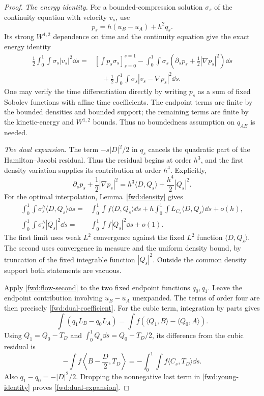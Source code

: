 \begin{proof}
\emph{The energy identity.}
For a bounded-compression solution \(\sigma_s\) of the continuity
equation with velocity \(v_s\), use
\[
 p_s=h(u_B-u_A)+h^2q_s.
\]
Its strong \(W^{1,2}\) dependence on time and the continuity
equation give the exact energy identity
\begin{align}
 \frac12\int_0^1\int\sigma_s|v_s|^2\dd s
 ={}&\left[\int p_s\sigma_s\right]_{s=0}^{s=1}
 -\int_0^1\int\sigma_s
      \left(\partial_sp_s+\frac12|\nabla p_s|^2\right)\dd s
 \nonumber\\
 &\quad+\frac12\int_0^1\int\sigma_s|v_s-\nabla p_s|^2\dd s.
 \label{fwd:young-identity}
\end{align}
One may verify the time differentiation directly by writing \(p_s\)
as a sum of fixed Sobolev functions with affine time coefficients.
The endpoint terms are finite by the bounded densities and bounded
support; the remaining terms are finite by the kinetic-energy and
\(W^{1,2}\) bounds. Thus no boundedness assumption on \(q_{AB}\)
is needed.

\emph{The dual expansion.}
The term \(-s|D|^2/2\) in \(q_s\) cancels the quadratic part of
the Hamilton--Jacobi residual. Thus the residual begins at order
\(h^3\), and the first density variation supplies its contribution
at order \(h^4\). Explicitly,
\begin{equation}
\label{fwd:residual}
 \partial_sp_s+\frac12|\nabla p_s|^2
 =h^3\langle D,Q_s\rangle+\frac{h^4}{2}|Q_s|^2.
\end{equation}
For the optimal interpolation, Lemma~\ref{fwd:density} gives
\begin{align*}
 \int_0^1\int\sigma^h_s\langle D,Q_s\rangle\dd s
 ={}&\int_0^1\int f\langle D,Q_s\rangle\dd s
 +h\int_0^1\int L_{C_s}\langle D,Q_s\rangle\dd s+o(h),\\
 \int_0^1\int\sigma^h_s|Q_s|^2\dd s
 ={}&\int_0^1\int f|Q_s|^2\dd s+o(1).
\end{align*}
The first limit uses weak \(L^2\) convergence against the fixed
\(L^2\) function \(\langle D,Q_s\rangle\). The second uses convergence
in measure and the uniform density bound, by truncation of the fixed
integrable function \(|Q_s|^2\). Outside the common density support
both statements are vacuous.

Apply \eqref{fwd:flow-second} to the two fixed endpoint functions
\(q_0,q_1\). Leave the endpoint contribution involving
\(u_B-u_A\) unexpanded. The terms of order four are then precisely
\eqref{fwd:dual-coefficient}. For the cubic term, integration by
parts gives
\[
 \int(q_1L_B-q_0L_A)
 =\int f(\langle Q_1,B\rangle-\langle Q_0,A\rangle).
\]
Using \(Q_1=Q_0-T_D\) and
\(\int_0^1Q_s\dd s=Q_0-T_D/2\), its difference from the cubic
residual is
\[
 -\int f\left\langle B-\frac D2,T_D\right\rangle
 =-\int_0^1\int f\langle C_s,T_D\rangle\dd s.
\]
Also \(q_1-q_0=-|D|^2/2\). Dropping the nonnegative last term in
\eqref{fwd:young-identity} proves \eqref{fwd:dual-expansion}.


\end{proof}
